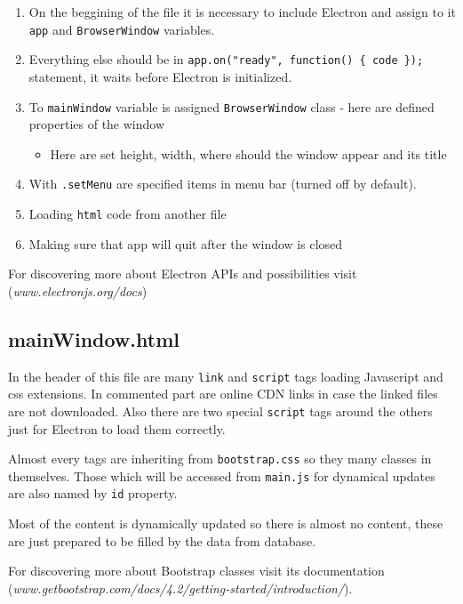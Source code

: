 \documentclass[12pt]{article}
\providecommand{\tightlist}{\setlength{\itemsep}{1pt}\setlength{\parskip}{1pt}}
\let\oldtexttt\texttt
\renewcommand{\texttt}[1]{\oldtexttt{\textcolor{codehighlight}{#1}}}
\begin{document}
\begin{enumerate}
\def\labelenumi{\arabic{enumi}.}
\tightlist
\item
  On the beggining of the file it is necessary to include Electron and
  assign to it \texttt{app} and \texttt{BrowserWindow} variables.
\item
  Everything else should be in
  \texttt{app.on("ready",\ function()\ \{\ code\ \});} statement, it
  waits before Electron is initialized.
\item
  To \texttt{mainWindow} variable is assigned \texttt{BrowserWindow}
  class - here are defined properties of the window

  \begin{itemize}
  \tightlist
  \item
    Here are set height, width, where should the window appear and its
    title
  \end{itemize}
\item
  With \texttt{.setMenu} are specified items in menu bar (turned off by
  default).
\item
  Loading \texttt{html} code from another file
\item
  Making sure that app will quit after the window is closed
\end{enumerate}

For discovering more about Electron APIs and possibilities visit
(\emph{www.electronjs.org/docs})

\hypertarget{mainwindow.html}{%
\subsection{mainWindow.html}\label{mainwindow.html}}

In the header of this file are many \texttt{link} and \texttt{script}
tags loading Javascript and css extensions. In commented part are online
CDN links in case the linked files are not downloaded. Also there are
two special \texttt{script} tags around the others just for Electron to
load them correctly.

Almost every tags are inheriting from \texttt{bootstrap.css} so they
many classes in themselves. Those which will be accessed from
\texttt{main.js} for dynamical updates are also named by \texttt{id}
property.

Most of the content is dynamically updated so there is almost no
content, these are just prepared to be filled by the data from database.

For discovering more about Bootstrap classes visit its documentation
(\emph{www.getbootstrap.com/docs/4.2/getting-started/introduction/}).
\end{document}
